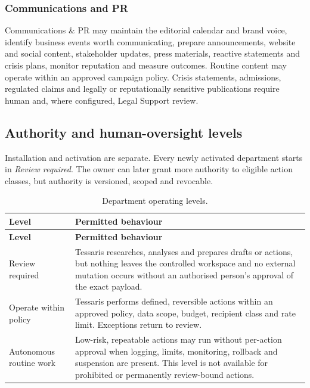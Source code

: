 \subsubsection{Communications and PR}

Communications \& PR may maintain the editorial calendar and brand voice,
identify business events worth communicating, prepare announcements, website
and social content, stakeholder updates, press materials, reactive statements
and crisis plans, monitor reputation and measure outcomes.  Routine content may
operate within an approved campaign policy.  Crisis statements, admissions,
regulated claims and legally or reputationally sensitive publications require
human and, where configured, Legal Support review.

\subsection{Authority and human-oversight levels}

Installation and activation are separate.  Every newly activated department
starts in \emph{Review required}.  The owner can later grant more authority to
eligible action classes, but authority is versioned, scoped and revocable.

\begin{longtable}{@{}p{}p{}@{}}
\caption{Department operating levels.}
\label{tab:specialist-operating-levels}\\
\toprule
\textbf{Level} & \textbf{Permitted behaviour} \\
\midrule
\endfirsthead
\toprule
\textbf{Level} & \textbf{Permitted behaviour} \\
\midrule
\endhead
Review required & Tessaris researches, analyses and prepares drafts or actions,
but nothing leaves the controlled workspace and no external mutation occurs
without an authorised person's approval of the exact payload. \\
Operate within policy & Tessaris performs defined, reversible actions within an
approved policy, data scope, budget, recipient class and rate limit.  Exceptions
return to review. \\
Autonomous routine work & Low-risk, repeatable actions may run without per-action
approval when logging, limits, monitoring, rollback and suspension are present.
This level is not available for prohibited or permanently review-bound actions. \\
\bottomrule
\end{longtable}

